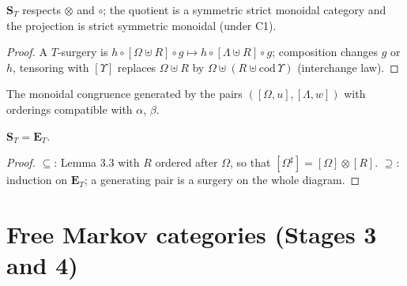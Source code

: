 \begin{theorem}
\label{thm:3.quot}
\leanok
{}
$\mathbf S_T$ respects $\otimes$ and $\circ$; the quotient is a symmetric strict
monoidal category and the projection is strict symmetric monoidal (under C1).
\end{theorem}
\begin{proof}
\leanok
A $T$-surgery is $h \circ [\Omega \uplus R] \circ g \mapsto h \circ [\Lambda \uplus R] \circ g$;
composition changes $g$ or $h$, tensoring with $[\Upsilon]$ replaces $\Omega \uplus R$ by
$\Omega \uplus (R \uplus \mathrm{cod}\,\Upsilon)$ (interchange law).
\end{proof}

\begin{definition}[$\mathbf E_T$]
\label{def:3.ET}
\leanok
{}
The monoidal congruence generated by the pairs $([\Omega,u],[\Lambda,w])$ with
orderings compatible with $\alpha$, $\beta$.
\end{definition}

\begin{corollary}[Corollary 3.5]
\label{cor:3.5}
\leanok
{}
$\mathbf S_T = \mathbf E_T$.
\end{corollary}
\begin{proof}
\leanok
$\subseteq$: Lemma 3.3 with $R$ ordered after $\Omega$, so that
$[\Omega^\sharp] = [\Omega] \otimes [R]$.  $\supseteq$: induction on $\mathbf E_T$; a
generating pair is a surgery on the whole diagram.
\end{proof}

\section{Free Markov categories (Stages 3 and 4)}

